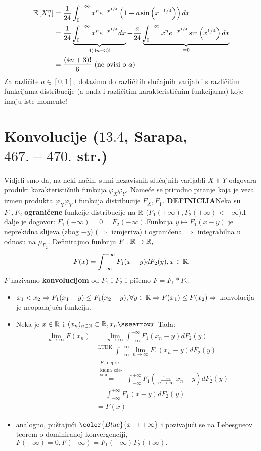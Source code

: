 \documentclass{article}
\begin{document}
\[\begin{aligned}\Bbb E\left[X_a^n\right]&=\frac1{24}\int_0^{+\infty}x^ne^{-x^{1/4}}\left(1-a\sin\left(x^{-1/4}\right)\right)dx\\&=\frac1{24}\underbrace{\int_0^{+\infty}x^ne^{-x^{1/4}}dx}_{4(4n+3)!}-\frac{a}{24}\underbrace{\int_0^{+\infty}x^ne^{-x^{1/4}}\sin\left(x^{1/4}\right)dx}_{=0}\\&=\frac{(4n+3)!}6\text{ (ne ovisi o }a\text{)}\end{aligned}\] Za različite \(a\in[0,1],\) dolazimo do različitih slučajnih varijabli s različitim funkcijama distribucije (a onda i različitim karakterističnim funkcijama) koje imaju iste momente!\newpage
\section{Konvolucije (\textsection \(13.4\), Sarapa, \(467.-470.\) str.)}
Vidjeli smo da, na neki način, sumi nezavisnih slučajnih varijabli \(X+Y\) odgovara produkt karakterističnih funkcija \(\varphi_X\varphi_Y.\) Nameće se prirodno pitanje koja je veza izme\dj{}u produkta \(\varphi_X\varphi_Y\) i funkcija distribucije \(F_X,F_Y.\)\newline\newline
\textbf{DEFINICIJA}\newline Neka su \(F_1,F_2\) \textbf{ograničene} funkcije distribucije na \(\Bbb R\) (\(F_1(+\infty),F_2(+\infty)<+\infty\)).\newline I dalje je dogovor: \(F_1(-\infty)=0=F_2(-\infty).\)\newline Funkcija \(y\mapsto F_1(x-y)\) je neprekidna slijeva (zbog \(-y\)) (\(\Rightarrow\) izmjeriva) i ograničena \(\Rightarrow\) integrabilna u odnosu na \(\mu_{F_2}.\) Definirajmo funkciju \(F:\Bbb R\to\Bbb R,\) \[F(x)=\int_{-\infty}^{+\infty}F_1(x-y)dF_2(y),x\in\Bbb R.\] \(F\) nazivamo \textbf{konvolucijom} od \(F_1\) i \(F_2\) i pišemo \(F=F_1*F_2.\)  
\begin{itemize}
    \item[\ding{113}] \(x_1<x_2\Rightarrow F_1(x_1-y)\le F_1(x_2-y),\forall y\in\Bbb R\Rightarrow F(x_1)\le F(x_2)\Rightarrow\) konvolucija je neopadajuća funkcija. 
    \item[\ding{113}] Neka je \(x\in\Bbb R\) i \((x_n)_{n\in\Bbb N}\subset\Bbb R,x_n\ssearrow x\) Tada: \[\begin{aligned}\lim_{n\to\infty}F(x_n)&=\lim_{n\to\infty}\int_{-\infty}^{+\infty}F_1(x_n-y)dF_2(y)\\&\overset{\text{LTDK}}{=}\int_{-\infty}^{+\infty}\lim_{n\to\infty}F_1(x_n-y)dF_2(y)\\&\overset{\substack{F_1\text{ nepre-}\\\text{kidna zde-}\\\text{sna}}}{=}\int_{-\infty}^{+\infty} F_1\left(\lim_{n\to\infty}x_n-y\right)dF_2(y)\\&=\int_{-\infty}^{+\infty}F_1(x-y)dF_2(y)\\&=F(x)\end{aligned}\]
    \item[\ding{113}] analogno, puštajući \(\color{Blue}{x\to+\infty}\) i pozivajući se na Lebesgueov teorem o dominiranoj konvergenciji, \(F(-\infty)=0, F(+\infty)=F_1(+\infty)F_2(+\infty).\) 
\end{itemize}
\end{document}
